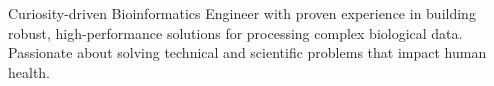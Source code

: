 %
%
%

\par{
    Curiosity-driven Bioinformatics Engineer with proven experience in building robust, high-performance solutions for
    processing complex biological data. Passionate about solving technical and scientific problems that impact human health.
}
\\